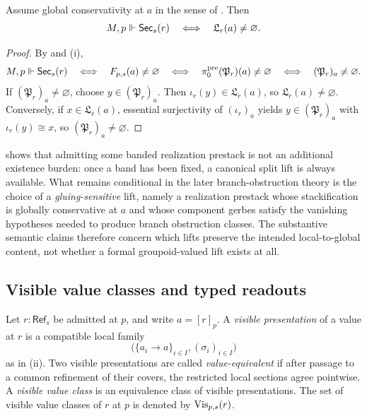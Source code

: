 \begin{proposition}\label{prop:no-new-global-objects}
Assume global conservativity at $a$ in the sense of . Then
\[
M,p\Vdash \mathsf{Sec}_s(r)
\quad\Longleftrightarrow\quad
\mathfrak L_r(a)\neq\varnothing.
\]
\end{proposition}

\begin{proof}
By  and (i),
\[
M,p\Vdash \mathsf{Sec}_s(r)
\quad\Longleftrightarrow\quad
F_{p,s}(a)\neq\varnothing
\quad\Longleftrightarrow\quad
\pi_0^{\mathrm{pre}}(\mathfrak P_r)(a)\neq\varnothing
\quad\Longleftrightarrow\quad
(\mathfrak P_r)_a\neq\varnothing.
\]
If $(\mathfrak P_r)_a\neq\varnothing$, choose $y\in (\mathfrak P_r)_a$. Then $\iota_r(y)\in \mathfrak L_r(a)$, so $\mathfrak L_r(a)\neq\varnothing$. Conversely, if $x\in \mathfrak L_r(a)$, essential surjectivity of $(\iota_r)_a$ yields $y\in (\mathfrak P_r)_a$ with $\iota_r(y)\cong x$, so $(\mathfrak P_r)_a\neq\varnothing$.
\end{proof}

\begin{remark}\label{rem:gluing-sensitive-lifts}
 shows that admitting some banded realization prestack is not an additional existence burden: once a band has been fixed, a canonical split lift is always available. What remains conditional in the later branch-obstruction theory is the choice of a \emph{gluing-sensitive} lift, namely a realization prestack whose stackification is globally conservative at $a$ and whose component gerbes satisfy the vanishing hypotheses needed to produce branch obstruction classes. The substantive semantic claims therefore concern which lifts preserve the intended local-to-global content, not whether a formal groupoid-valued lift exists at all.
\end{remark}

\subsection{Visible value classes and typed readouts}

\begin{definition}\label{def:visible-value-classes}
Let $r:\mathsf{Ref}_s$ be admitted at $p$, and write $a=[r]_p$. A \emph{visible presentation} of a value at $r$ is a compatible local family
\[
\bigl(\{a_i\to a\}_{i\in I},(\sigma_i)_{i\in I}\bigr)
\]
as in (ii). Two visible presentations are called \emph{value-equivalent} if after passage to a common refinement of their covers, the restricted local sections agree pointwise. A \emph{visible value class} is an equivalence class of visible presentations. The set of visible value classes of $r$ at $p$ is denoted by $\mathrm{Vis}_{p,s}(r)$.
\end{definition}

